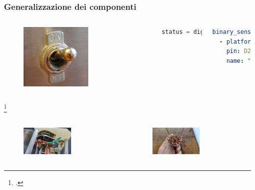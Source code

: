 \documentclass[aspectratio=169]{beamer}
\begin{document}
\begin{frame}
\frametitle{Generalizzazione dei componenti}
\begin{columns}
\begin{figure}[h]
  \centering
  \includegraphics[width=0.6\textwidth]{switch}\footnotemark 
  
\end{figure}

\begin{lstlisting}[language=cpp]
status = digitalRead(D2);
\end{lstlisting}

\begin{lstlisting}[language=yaml]
binary_sensor:
  - platform: gpio
    pin: D2
    name: "Interruttore"
\end{lstlisting}
\end{columns}
\footcitetext{wiki:switch}

\framebreak
\begin{columns}

\begin{figure}[h]
  \centering
  \includegraphics[width=0.6\textwidth]{commutatoreStock}
  
\end{figure}
\begin{figure}[h]
  \centering
  \includegraphics[width=0.6\textwidth]{commutatorePartitore}
  

\end{figure}
\end{columns}
\end{frame}
\end{document}
